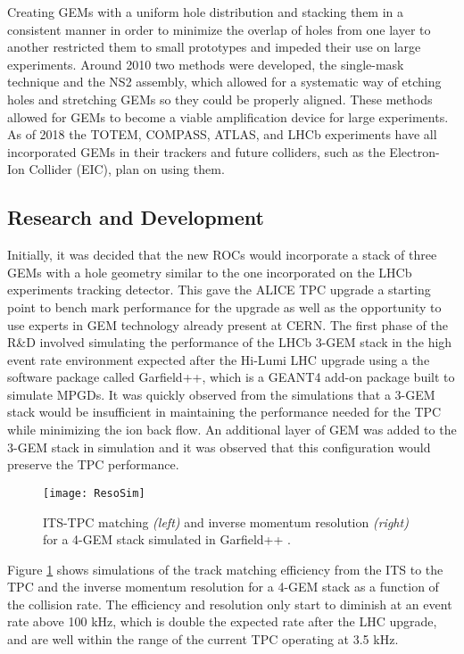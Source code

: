 Creating GEMs with a uniform hole distribution and stacking them in a consistent manner in order to minimize the overlap of holes from one layer to another restricted them to small prototypes and impeded their use on large experiments.  Around 2010 two methods were developed, the single-mask technique\cite{0960-1317-17-8-021} and the NS2 assembly\cite{1748-0221-12-06-C06036}, which allowed for a systematic way of etching holes and stretching GEMs so they could be properly aligned.  These methods allowed for GEMs to become a viable amplification device for large experiments.  As of 2018 the TOTEM, COMPASS, ATLAS, and LHCb experiments have all incorporated GEMs in their trackers and future colliders, such as the Electron-Ion Collider (EIC), plan on using them\cite{SAULI20162}.


\subsection{Research and Development}

Initially, it was decided that the new ROCs would incorporate a stack of three GEMs with a hole geometry similar to the one incorporated on the LHCb experiments\cite{Santimaria:1690550} tracking detector.  This gave the ALICE TPC upgrade a starting point to bench mark performance for the upgrade as well as the opportunity to use experts in GEM technology already present at CERN.  The first phase of the R\&D involved simulating the performance of the LHCb 3-GEM stack in the high event rate environment expected  after the Hi-Lumi LHC upgrade using a the software package called Garfield++, which is a GEANT4 add-on package built to simulate MPGDs.  It was quickly observed from the simulations that a 3-GEM stack would be insufficient in maintaining the performance needed for the TPC while minimizing the ion back flow.  An additional layer of GEM was added to the 3-GEM stack in simulation and it was observed that this configuration would preserve the TPC performance.

\begin{figure}[h]
\texttt{[image: ResoSim]}
\centering
\caption{ITS-TPC matching  \textit{(left)} and inverse momentum resolution \textit{(right)} for a 4-GEM stack simulated in Garfield++ \cite{Dick2017QM}. }
\label{fig:ResoSim}
\end{figure}

\noindent
Figure \ref{fig:ResoSim} shows simulations of the track matching efficiency from the ITS to the TPC and the inverse momentum resolution for a 4-GEM stack as a function of the collision rate.  The efficiency and resolution only start to diminish at an event rate above 100 kHz, which is double the expected rate after the LHC upgrade, and are well within the range of the current TPC operating at 3.5 kHz.
 
